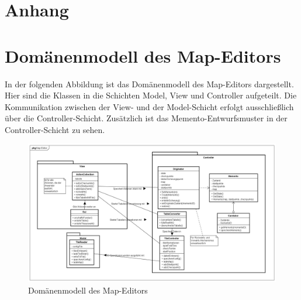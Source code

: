 \documentclass[12pt,a4paper,bibliography=totocnumbered,listof=totocnumbered]{article}
\begin{document}
\printbibliography[heading=Literatur,filter=Literatur] 

\pagebreak


\lhead{} 

\printbibliography[title = {Quellenverzeichnis}, heading=Quellen,filter=Quellen] 

\pagebreak 

\setcounter{page}{1}

\begin{appendix}
\section*{Anhang}
{}



\section{Domänenmodell des Map-Editors}
In der folgenden Abbildung ist das Domänenmodell des Map-Editors dargestellt. Hier sind die Klassen in die Schichten Model, View und Controller aufgeteilt. Die Kommunikation zwischen der View- und der Model-Schicht erfolgt ausschließlich über die Controller-Schicht. Zusätzlich ist das Memento-Entwurfsmuster in der Controller-Schicht zu sehen.

\begin{figure}[h]
\centering
\includegraphics[width=\textwidth,keepaspectratio]{pics/domainmodell_mapeditor_complete.png}
\caption{Domänenmodell des Map-Editors}
\label{abb:domainmodell-mapeditor-complete}
\end{figure}


\end{appendix}


\pagebreak
\end{document}
